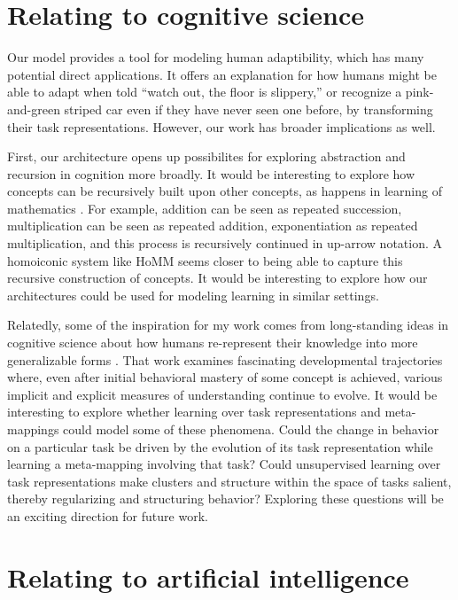 \section{Relating to cognitive science}

Our model provides a tool for modeling human adaptibility, which has many potential direct applications. It offers an explanation for how humans might be able to adapt when told ``watch out, the floor is slippery,'' or recognize a pink-and-green striped car even if they have never seen one before, by transforming their task representations. However, our work has broader implications as well. \par 

First, our architecture opens up possibilites for exploring abstraction and recursion in cognition more broadly. It would be interesting to explore how concepts can be recursively built upon other concepts, as happens in learning of mathematics \citep{Wilensky1991, Hazzan1999, Lampinen2017b}. For example, addition can be seen as repeated succession, multiplication can be seen as repeated addition, exponentiation as repeated multiplication, and this process is recursively continued in up-arrow notation. A homoiconic system like HoMM seems closer to being able to capture this recursive construction of concepts. It would be interesting to explore how our architectures could be used for modeling learning in similar settings. \par 

Relatedly, some of the inspiration for my work comes from long-standing ideas in cognitive science about how humans re-represent their knowledge into more generalizable forms \citep{Karmiloff-Smith1986,Clark1993}. That work examines fascinating developmental trajectories where, even after initial behavioral mastery of some concept is achieved, various implicit and explicit measures of understanding continue to evolve. It would be interesting to explore whether learning over task representations and meta-mappings could model some of these phenomena. Could the change in behavior on a particular task be driven by the evolution of its task representation while learning a meta-mapping involving that task? Could unsupervised learning over task representations make clusters and structure within the space of tasks salient, thereby regularizing and structuring behavior? Exploring these questions will be an exciting direction for future work.\par 

\section{Relating to artificial intelligence}


